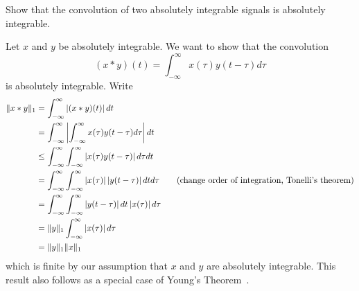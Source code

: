 \begin{excersizelist}
\begin{hardexercise}
\item \label{excer:convabsisabs} Show that the convolution of two absolutely integrable signals is absolutely integrable.
\begin{solution}
Let $x$ and $y$ be absolutely integrable.  We want to show that the convolution
\[
(x * y)(t) = \int_{-\infty}^\infty x(\tau) y(t - \tau) d\tau
\]
is absolutely integrable.  Write
\begin{align*}
\|x * y\|_1 &= \int_{-\infty}^\infty \left\vert (x * y)(t) \right\vert dt \\
&= \int_{-\infty}^\infty \left\vert \int_{-\infty}^\infty x(\tau) y(t - \tau) d\tau  \right\vert dt \\
 &\leq \int_{-\infty}^\infty \int_{-\infty}^\infty \left\vert  x(\tau) y(t - \tau)  \right\vert d\tau dt \\
 &= \int_{-\infty}^\infty \int_{-\infty}^\infty \left\vert  x(\tau)   \right\vert\left\vert  y(t - \tau)  \right\vert dt d\tau \qquad \text{(change order of integration, Tonelli's theorem)} \\
 &= \int_{-\infty}^\infty \int_{-\infty}^\infty \left\vert  y(t - \tau)  \right\vert dt \left\vert  x(\tau)  \right\vert d\tau \\
  &= \|y\|_1 \int_{-\infty}^\infty \left\vert  x(\tau)  \right\vert d\tau \\
  &= \|y\|_1 \|x\|_1
\end{align*}
which is finite by our assumption that $x$ and $y$ are absolutely integrable.  This result also follows as a special case of Young's Theorem~\citep{Rudin_real_and_complex_analysis}.
\end{solution}
\end{hardexercise}



\end{excersizelist}

